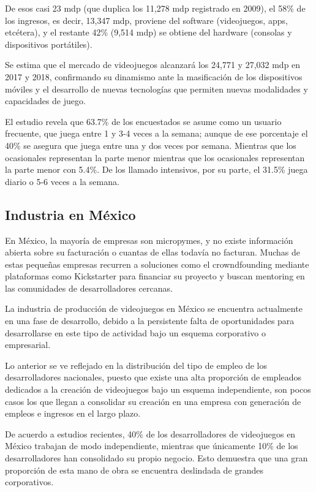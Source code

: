 \documentclass{article}
\begin{document}
De esos casi 23 mdp (que duplica los 11,278 mdp registrado en 2009), el 58\% de los ingresos, es decir, 13,347 mdp, proviene del software (videojuegos, apps, etcétera), y el restante 42\% (9,514 mdp) se obtiene del hardware (consolas y dispositivos portátiles).

Se estima que el mercado de videojuegos alcanzará los 24,771 y 27,032 mdp en 2017 y 2018, confirmando su dinamismo ante la masificación de los dispositivos móviles y el desarrollo de nuevas tecnologías que permiten nuevas modalidades y capacidades de juego.

El estudio revela que 63.7\% de los encuestados se asume como un usuario frecuente, que juega entre 1 y 3-4 veces a la semana; aunque de ese porcentaje el 40\% se asegura que juega entre una y dos veces por semana. Mientras que los ocasionales representan la parte menor mientras que los ocasionales representan la parte menor con 5.4\%. De los llamado intensivos, por su parte, el 31.5\% juega diario o 5-6 veces a la semana.

\subsection{Industria en México}
En México, la mayoría de empresas son micropymes, y no existe información abierta sobre su facturación o cuantas de ellas todavía no facturan. Muchas de estas pequeñas empresas recurren a soluciones como el crowndfounding mediante plataformas como Kickstarter para financiar su proyecto y buscan mentoring en las comunidades de desarrolladores cercanas. 

La industria de producción de videojuegos en México se encuentra actualmente en una fase de desarrollo, debido a la persistente falta de oportunidades para desarrollarse en este tipo de actividad bajo un esquema corporativo o empresarial.

Lo anterior se ve reflejado en la distribución del tipo de empleo de los desarrolladores nacionales, puesto que existe una alta proporción de empleados dedicados a la creación de videojuegos bajo un esquema independiente, son pocos casos los que llegan a consolidar su creación en una empresa con generación de empleos e ingresos en el largo plazo.

De acuerdo a estudios recientes, 40\% de los desarrolladores de videojuegos en México trabajan de modo independiente, mientras que únicamente 10\% de los desarrolladores han consolidado su propio negocio. Esto demuestra que una gran proporción de esta mano de obra se encuentra deslindada de grandes corporativos.
\end{document}
